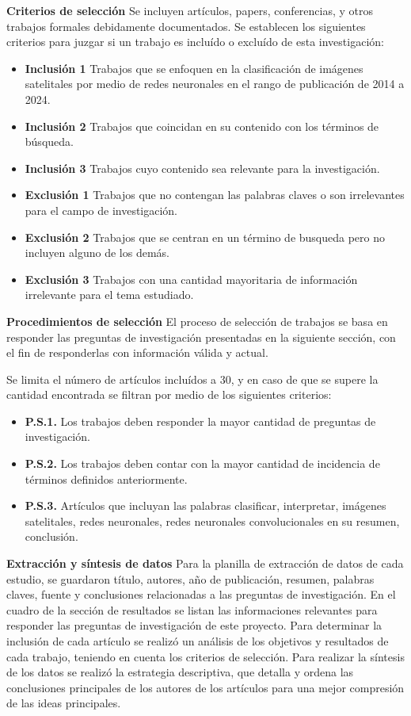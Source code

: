{\bf Criterios de selección} Se incluyen artículos, papers, conferencias, y otros trabajos formales debidamente
documentados. Se establecen los siguientes criterios para juzgar si un trabajo es incluído o excluído de esta
investigación:
\begin{itemize}
    \item[] {\bf Inclusión 1} Trabajos que se enfoquen en la clasificación de imágenes satelitales por medio de redes
        neuronales en el rango de publicación de 2014 a 2024.
    \item[] {\bf Inclusión 2} Trabajos que coincidan en su contenido con los términos de búsqueda.
    \item[] {\bf Inclusión 3} Trabajos cuyo contenido sea relevante para la investigación.
    \item[] {\bf Exclusión 1} Trabajos que no contengan las palabras claves o son irrelevantes para el campo de
        investigación.
    \item[] {\bf Exclusión 2} Trabajos que se centran en un término de busqueda pero no incluyen alguno de los demás.
    \item[] {\bf Exclusión 3} Trabajos con una cantidad mayoritaria de información irrelevante para el tema estudiado.
\end{itemize}

{\bf Procedimientos de selección} El proceso de selección de trabajos se basa en responder las preguntas de
investigación presentadas en la siguiente sección, con el fin de responderlas con información válida y actual.

Se limita el número de artículos incluídos a 30, y en caso de que se supere la cantidad encontrada se filtran por medio
de los siguientes criterios:

\begin{itemize}
    \item[] {\bf P.S.1.} Los trabajos deben responder la mayor cantidad de preguntas de investigación.
    \item[] {\bf P.S.2.} Los trabajos deben contar con la mayor cantidad de incidencia de términos definidos
        anteriormente.
    \item[] {\bf P.S.3.} Artículos que incluyan las palabras clasificar, interpretar, imágenes satelitales, redes
        neuronales, redes neuronales convolucionales en su resumen, conclusión.
\end{itemize}

{\bf Extracción y síntesis de datos} Para la planilla de extracción de datos de cada estudio, se guardaron título,
autores, año de publicación, resumen, palabras claves, fuente y conclusiones relacionadas a las preguntas de
investigación. En el cuadro de la sección de resultados se listan las informaciones relevantes para responder las
preguntas de investigación de este proyecto. Para determinar la inclusión de cada artículo se realizó un análisis de
los objetivos y resultados de cada trabajo, teniendo en cuenta los criterios de selección. Para realizar la síntesis de
los datos se realizó la estrategia descriptiva, que detalla y ordena las conclusiones principales de los autores de los
artículos para una mejor compresión de las ideas principales.

